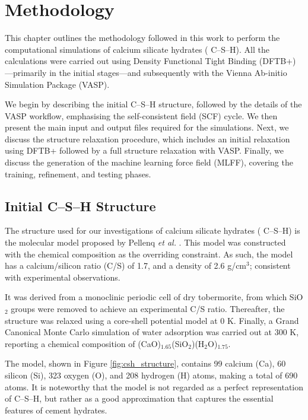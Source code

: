 \chapter{Methodology}
\label{Chapter3}
This chapter outlines the methodology followed in this work to perform the computational simulations of calcium silicate hydrates ( C--S--H). All the calculations were carried out using Density Functional Tight Binding (DFTB+)---primarily in the initial stages---and subsequently with the Vienna Ab-initio Simulation Package (VASP).

We begin by describing the initial  C--S--H structure, followed by the 
details of the VASP workflow, emphasising the self-consistent field (SCF) cycle. We then present the main input and output files required for the simulations. Next, we discuss the structure relaxation procedure, which includes an initial relaxation using DFTB+ followed by a full structure relaxation with VASP. Finally, we discuss the generation of the machine learning force field (MLFF), covering the training, refinement, and testing phases. 

\section{Initial  C--S--H Structure}
\label{sec:csh-structure}
The structure used for our investigations of calcium silicate hydrates ( C--S--H) is the molecular model proposed by Pellenq \emph{et al.} \cite{Pellenq2009}. This model was constructed with the chemical composition as the overriding constraint. As such, the model has a calcium/silicon ratio (C/S) of 1.7, and a density of 2.6 g/cm$^3$; consistent with experimental observations. 

It was derived from a monoclinic periodic cell of dry tobermorite, from which SiO$_2$ groups were removed to achieve an experimental C/S ratio. Thereafter, the structure was relaxed using a core-shell potential model at 0 K. Finally, a Grand Canonical Monte Carlo simulation of water adsorption was carried out at 300 K, reporting a chemical composition of (CaO)$_{1.65}$(SiO$_2$)(H$_2$O)$_{1.75}$. 

The model, shown in Figure \ref{fig:csh_structure}, contains
99 calcium (Ca), 60 silicon (Si), 323 oxygen (O), and 208 hydrogen (H) atoms, making a total of 690 atoms. It is noteworthy that the model is not regarded as a perfect representation of  C--S--H, but rather as a good approximation that captures the essential features of cement hydrates.


